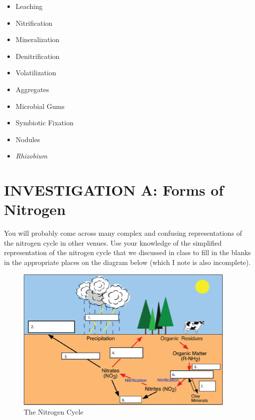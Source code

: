 \documentclass[
  letterpaper,
  twocolumn,
  portrait]{scrbook}
\providecommand{\tightlist}{%
  \setlength{\itemsep}{0pt}\setlength{\parskip}{0pt}}\usepackage{longtable,booktabs,array}
\begin{document}
\begin{tcolorbox}[enhanced jigsaw, colframe=quarto-callout-tip-color-frame, coltitle=black, arc=.35mm, breakable, bottomrule=.15mm, colback=white, rightrule=.15mm, toprule=.15mm, opacityback=0, bottomtitle=1mm, left=2mm, titlerule=0mm, leftrule=.75mm, opacitybacktitle=0.6, toptitle=1mm, title=\textcolor{quarto-callout-tip-color}{\faLightbulb}\hspace{0.5em}{Key Words \& Concepts}, colbacktitle=quarto-callout-tip-color!10!white]

\begin{itemize}
\tightlist
\item
  Leaching
\item
  Nitrification
\item
  Mineralization
\item
  Denitrification
\item
  Volatilization
\item
  Aggregates
\item
  Microbial Gums
\item
  Symbiotic Fixation
\item
  Nodules
\item
  \emph{Rhizobium}
\end{itemize}

\end{tcolorbox}

\hypertarget{investigation-a-forms-of-nitrogen}{%
\section{INVESTIGATION A: Forms of
Nitrogen}\label{investigation-a-forms-of-nitrogen}}

You will probably come across many complex and confusing representations
of the nitrogen cycle in other venues. Use your knowledge of the
simplified representation of the nitrogen cycle that we discussed in
class to fill in the blanks in the appropriate places on the diagram
below (which I note is also incomplete).

\begin{figure}

{\centering \includegraphics{forms-of-nitrogenPicture1.png}

}

\caption{\label{fig-nitrogen}The Nitrogen Cycle}

\end{figure}
\end{document}
